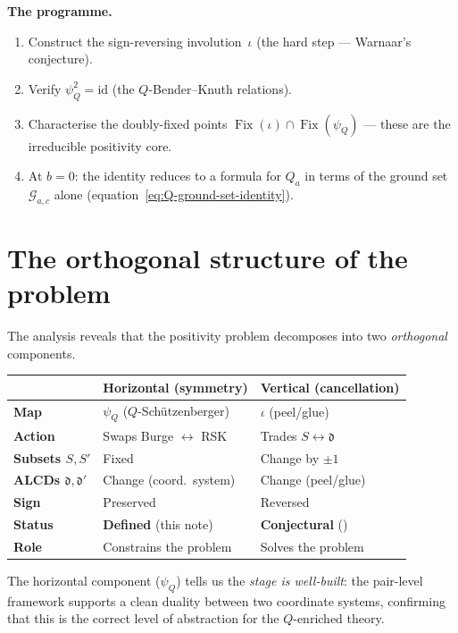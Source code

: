 \documentclass[11pt]{article}
\DeclareMathOperator{\Fix}{Fix}
\theoremstyle{plain}
\theoremstyle{definition}
\begin{document}
\medskip
\noindent\textbf{The programme.}
\begin{enumerate}
  \item Construct the sign-reversing involution~$\iota$
    (the hard step --- Warnaar's conjecture).
  \item Verify $\psi_Q^2 = \mathrm{id}$ (the
    $Q$-Bender--Knuth relations).
  \item Characterise the doubly-fixed points
    $\Fix(\iota) \cap \Fix(\psi_Q)$ --- these are the
    irreducible positivity core.
  \item At $b = 0$: the identity reduces to a formula for
    $Q_a$ in terms of the ground set $\mathcal{G}_{a,c}$
    alone (equation~\eqref{eq:Q-ground-set-identity}).
\end{enumerate}


\section{The orthogonal structure of the problem}
\label{sec:orthogonal}

The analysis reveals that the positivity problem decomposes into
two \emph{orthogonal} components.

\begin{center}
\begin{tabular}{l|l|l}
& \textbf{Horizontal (symmetry)} &
  \textbf{Vertical (cancellation)} \\ \hline
\textbf{Map} &
  $\psi_Q$ ($Q$-Sch\"utzenberger) &
  $\iota$ (peel/glue) \\[3pt]
\textbf{Action} &
  Swaps Burge $\leftrightarrow$ RSK &
  Trades $S \leftrightarrow \mathfrak{d}$ \\[3pt]
\textbf{Subsets $S, S'$} &
  Fixed &
  Change by $\pm 1$ \\[3pt]
\textbf{ALCDs $\mathfrak{d}, \mathfrak{d}'$} &
  Change (coord.\ system) &
  Change (peel/glue) \\[3pt]
\textbf{Sign} &
  Preserved &
  Reversed \\[3pt]
\textbf{Status} &
  \textbf{Defined} (this note) &
  \textbf{Conjectural} (\cite{LOCAL_RULE}) \\[3pt]
\textbf{Role} &
  Constrains the problem &
  Solves the problem
\end{tabular}
\end{center}

The horizontal component ($\psi_Q$) tells us the \emph{stage is
well-built}: the pair-level framework supports a clean duality
between two coordinate systems, confirming that this is the
correct level of abstraction for the $Q$-enriched theory.
\end{document}
